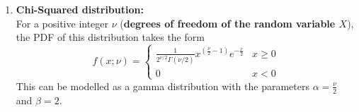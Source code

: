 \documentclass[a4paper]{article}
\begin{document}
\begin{itemize}
\begin{enumerate}
    \item \textbf{Chi-Squared distribution:}\\
    For a positive integer $\nu$ (\textbf{degrees of freedom of the random variable $X$}), the PDF of this distribution takes the form
    \begin{equation*}
        f(x; \nu) = \begin{cases}
        \frac{1}{2^{\nu/2}\Gamma(\nu/2)}x^{\left(\frac{\nu}{2}-1\right)}e^{-\frac{x}{2}} & x\geq 0\\
        0 & x < 0
        \end{cases}
    \end{equation*}
        This can be modelled as a gamma distribution with the parameters $\alpha = \frac{\nu}{2}$ and $\beta = 2$.
    \end{enumerate}
        
\end{itemize}
\end{document}
